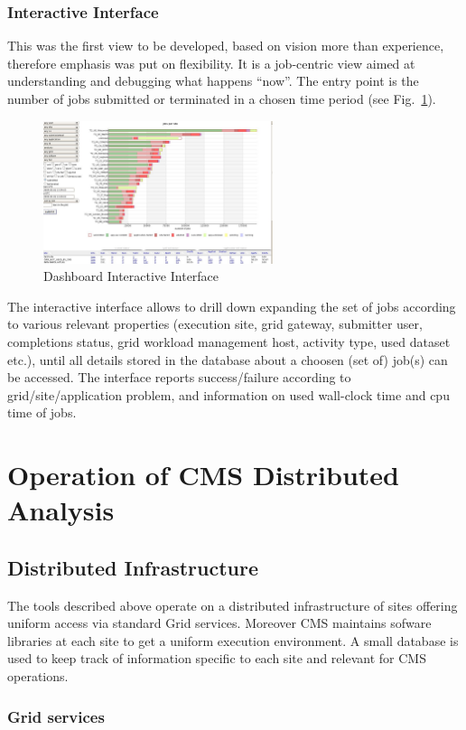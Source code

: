 \subsubsection{Interactive Interface}
This was the first view to be developed, based on
vision more than experience, therefore
emphasis was put on flexibility. It is a job-centric view
aimed at understanding and debugging what happens ``now''.
The entry point is the number of jobs submitted or
terminated in a chosen time period (see Fig.~\ref{fig:Dashboard}).
\begin{figure}
 \includegraphics[width=0.60\textwidth]{DashboardInteractive.eps}
\caption{Dashboard Interactive Interface}
\label{fig:Dashboard}
\end{figure}
The interactive interface allows to drill down expanding the set of jobs according to various relevant properties (execution site, grid gateway,
submitter user, completions status, grid workload management host,
activity type, used dataset etc.), until all details stored in the database
about a choosen (set of) job(s) can be accessed.
The interface reports success/failure according to grid/site/application problem, and information on used wall-clock time and cpu time of jobs.


\section{Operation of CMS Distributed Analysis}
\label{sec:4}
\subsection{Distributed Infrastructure}
\label{sec:4_1}
The tools described above operate on a distributed infrastructure
of sites offering uniform access via standard Grid services. Moreover CMS maintains sofware libraries at each site to get a uniform execution
environment. A small database is used to keep track of
information specific to each site and relevant for CMS operations.

\subsubsection{ Grid services }
\label{sec:4_1_1}

